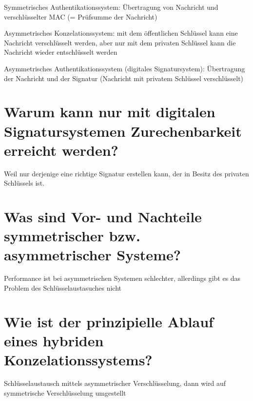 \documentclass{article}
\begin{document}
	Symmetrisches Authentikationssystem: Übertragung von Nachricht und verschlüsselter MAC (= Prüfsumme der Nachricht)
	
	Asymmetrisches Konzelationssystem: mit dem öffentlichen Schlüssel kann eine Nachricht verschlüsselt werden, aber nur mit dem privaten Schlüssel kann die Nachricht wieder entschlüsselt werden
	
	Asymmetrisches Authentikationssystem (digitales Signatursystem): Übertragung der Nachricht und der Signatur (Nachricht mit privatem Schlüssel verschlüsselt)
	
	\section*{Warum kann nur mit digitalen Signatursystemen Zurechenbarkeit erreicht werden?}
	Weil nur derjenige eine richtige Signatur erstellen kann, der in Besitz des privaten Schlüssels ist.
	
	\section*{Was sind Vor- und Nachteile symmetrischer bzw. asymmetrischer Systeme?}
	Performance ist bei asymmetrischen Systemen schlechter, allerdings gibt es das Problem des Schlüsselaustasuches nicht
	
	\section*{Wie ist der prinzipielle Ablauf eines hybriden Konzelationssystems?}
	Schlüsselaustausch mittels asymmetrischer Verschlüsselung, dann wird auf symmetrische Verschlüsselung umgestellt
	
\end{document}
